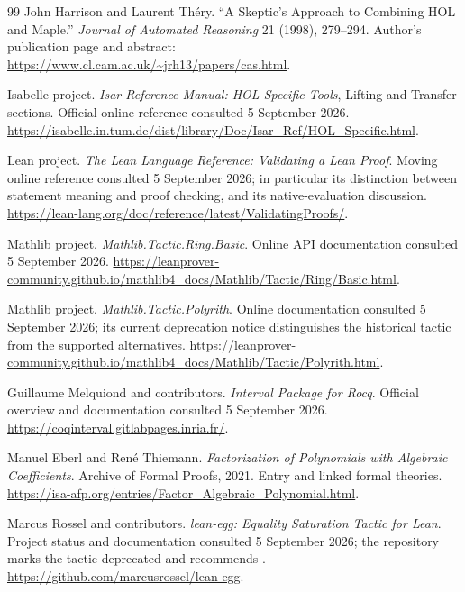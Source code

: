 \documentclass[11pt,a4paper]{article}
\newcommand{\code}[1]{\texttt{\detokenize{#1}}}
\theoremstyle{definition}
\theoremstyle{remark}
\begin{document}
\begin{thebibliography}{99}
 John Harrison and Laurent Th\'ery.
``A Skeptic's Approach to Combining HOL and Maple.''
\emph{Journal of Automated Reasoning} 21 (1998), 279--294.
Author's publication page and abstract:
\url{https://www.cl.cam.ac.uk/~jrh13/papers/cas.html}.

 Isabelle project.
\emph{Isar Reference Manual: HOL-Specific Tools}, Lifting and Transfer sections.
Official online reference consulted 5 September 2026.
\url{https://isabelle.in.tum.de/dist/library/Doc/Isar_Ref/HOL_Specific.html}.

 Lean project.
\emph{The Lean Language Reference: Validating a Lean Proof}.
Moving online reference consulted 5 September 2026; in particular its distinction between statement meaning and proof checking, and its native-evaluation discussion.
\url{https://lean-lang.org/doc/reference/latest/ValidatingProofs/}.

 Mathlib project.
\emph{Mathlib.Tactic.Ring.Basic}.
Online API documentation consulted 5 September 2026.
\url{https://leanprover-community.github.io/mathlib4_docs/Mathlib/Tactic/Ring/Basic.html}.

 Mathlib project.
\emph{Mathlib.Tactic.Polyrith}.
Online documentation consulted 5 September 2026; its current deprecation notice distinguishes the historical tactic from the supported alternatives.
\url{https://leanprover-community.github.io/mathlib4_docs/Mathlib/Tactic/Polyrith.html}.

 Guillaume Melquiond and contributors.
\emph{Interval Package for Rocq}.
Official overview and documentation consulted 5 September 2026.
\url{https://coqinterval.gitlabpages.inria.fr/}.

 Manuel Eberl and Ren\'e Thiemann.
\emph{Factorization of Polynomials with Algebraic Coefficients}.
Archive of Formal Proofs, 2021. Entry and linked formal theories.
\url{https://isa-afp.org/entries/Factor_Algebraic_Polynomial.html}.

 Marcus Rossel and contributors.
\emph{lean-egg: Equality Saturation Tactic for Lean}.
Project status and documentation consulted 5 September 2026; the repository marks the tactic deprecated and recommends \code{grind}.
\url{https://github.com/marcusrossel/lean-egg}.
\end{thebibliography}
\end{document}
